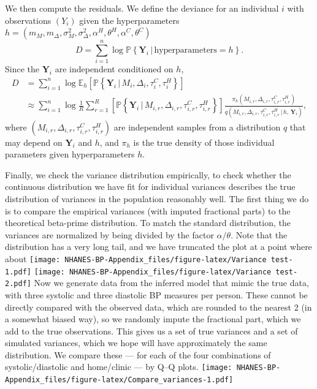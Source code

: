 \documentclass[
]{article}
\begin{document}
We then compute the residuals. We define the deviance for an individual \(i\) with observations \((Y_i)\)
given the hyperparameters \(h=(m_M,m_\Delta,\sigma^2_M,\sigma^2_\Delta,\alpha^H,\theta^H,\alpha^C,\theta^C)\)
\[
  D= \sum_{i=1}^n \log \mathbb{P}\left\{ \mathbf{Y}_{i}\,|\, \text{hyperparameters}=h\right\}.
\]
\newcommand{\wtb}{\widetilde\mathbf}
Since the \(\mathbf{Y}_i\) are independent conditioned on \(h\),
\begin{align*}
D&= \sum_{i=1}^n \log \mathbb{E}_h\left[ \mathbb{P}\left\{ \mathbf{Y}_i \, |\, M_i,\Delta_i,\tau_i^{C},\tau_i^H \right\} \right]\\
    &\approx \sum_{i=1}^n \log \frac1R\sum_{r=1}^R \left[ \mathbb{P}\left\{ \mathbf{Y}_i \, |\, M_{i,r},\Delta_{i,r},\tau_{i,r}^{C},\tau_{i,r}^{H} \right\}\right] \frac{\pi_h(M_{i,r},\Delta_{i,r},\tau_{i,r}^{C},\tau_{i,r}^{H} )}{q(M_{i,r},\Delta_{i,r},\tau_{i,r}^{C},\tau_{i,r}^{H} \, | \, h,\, \mathbf{Y}_i)},
\end{align*}
where \((M_{i,r},\Delta_{i,r},\tau_{i,r}^{C},\tau_{i,r}^{H})\) are independent samples from a distribution \(q\) that may depend
on \(\mathbf{Y}_i\) and \(h\), and \(\pi_h\) is the true density of those individual parameters given hyperparameters \(h\).

Finally, we check the variance distribution empirically, to check whether the continuous distribution we have fit for individual variances describes the true distribution of variances in the population reasonably well.
The first thing we do is to compare the empirical
variances (with imputed fractional parts) to the theoretical beta-prime distribution.
To match the standard distribution, the variances are normalized by being divided by the factor \(\alpha/\theta\).
Note that the distribution has a very long tail, and we have truncated the plot at a point where about
\texttt{[image: NHANES-BP-Appendix\_files/figure-latex/Variance test-1.pdf]} \texttt{[image: NHANES-BP-Appendix\_files/figure-latex/Variance test-2.pdf]}
Now we generate data from the inferred model that mimic the true data, with three systolic and three diastolic BP measures per person.
These cannot be directly compared with the observed data, which are rounded to the nearest 2 (in a somewhat biased way), so we randomly impute the fractional part, which we add to the true observations.
This gives us a set of true variances and a set of simulated variances, which we hope will have approximately the same distribution.
We compare these --- for each of the four combinations of systolic/diastolic and home/clinic --- by Q--Q plots.
\texttt{[image: NHANES-BP-Appendix\_files/figure-latex/Compare\_variances-1.pdf]}
\end{document}
